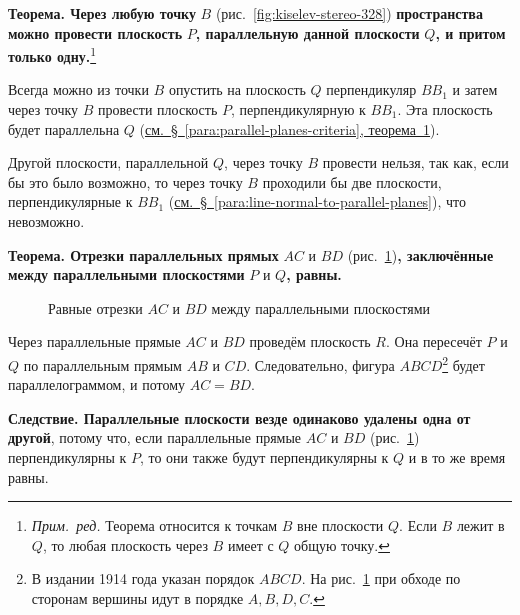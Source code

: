  \textbf{Теорема. Через любую точку} \(B\) (рис.~\ref{fig:kiselev-stereo-328}) \textbf{пространства можно провести плоскость} \(P\)\textbf{, параллельную данной плоскости} \(Q\)\textbf{, и притом только одну.}\footnote{\emph{Прим.~ред.} Теорема относится к точкам \(B\) вне плоскости \(Q\). Если \(B\) лежит в \(Q\), то любая плоскость через \(B\) имеет с \(Q\) общую точку.}

Всегда можно из точки \(B\) опустить на плоскость \(Q\) перпендикуляр \(BB_1\) и затем через точку \(B\) провести плоскость \(P\), перпендикулярную к \(BB_1\). Эта плоскость будет параллельна \(Q\) (\hyperref[para:parallel-planes-criteria]{см.~§~\ref*{para:parallel-planes-criteria}, теорема~1}).

Другой плоскости, параллельной \(Q\), через точку \(B\) провести нельзя, так как, если бы это было возможно, то через точку \(B\) проходили бы две плоскости, перпендикулярные к \(BB_1\) (\hyperref[para:line-normal-to-parallel-planes]{см.~§~\ref*{para:line-normal-to-parallel-planes}}), что невозможно.

 \textbf{Теорема. Отрезки параллельных прямых} \(AC\) и \(BD\) (рис.~\ref{fig:kiselev-stereo-329})\textbf{, заключённые между параллельными плоскостями} \(P\) и \(Q\)\textbf{, равны.}

\begin{figure}[htbp]
    \centering
    \renewcommand{\thefigure}{329}
    \captionsetup{name=Рис.,labelsep=period}
    
    \caption{Равные отрезки \(AC\) и \(BD\) между параллельными плоскостями}\label{fig:kiselev-stereo-329}
\end{figure}

Через параллельные прямые \(AC\) и \(BD\) проведём плоскость \(R\). Она пересечёт \(P\) и \(Q\) по параллельным прямым \(AB\) и \(CD\). Следовательно, фигура \(ABCD\)\footnote{В издании 1914 года указан порядок \(ABCD\). На рис.~\ref{fig:kiselev-stereo-329} при обходе по сторонам вершины идут в порядке \(A,B,D,C\).} будет параллелограммом, и потому \(AC=BD\).

 \textbf{Следствие. Параллельные плоскости везде одинаково удалены одна от другой}, потому что, если параллельные прямые \(AC\) и \(BD\) (рис.~\ref{fig:kiselev-stereo-329}) перпендикулярны к \(P\), то они также будут перпендикулярны к \(Q\) и в то же время равны.

